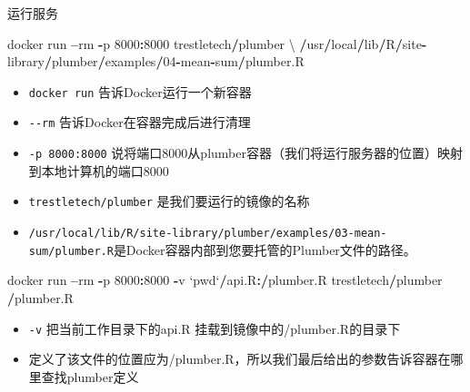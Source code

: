 \documentclass[]{book}
\newenvironment{Shaded}{\begin{snugshade}}{\end{snugshade}}
\newcommand{\DataTypeTok}[1]{\textcolor[rgb]{0.13,0.29,0.53}{#1}}
\newcommand{\DecValTok}[1]{\textcolor[rgb]{0.00,0.00,0.81}{#1}}
\newcommand{\StringTok}[1]{\textcolor[rgb]{0.31,0.60,0.02}{#1}}
\newcommand{\OperatorTok}[1]{\textcolor[rgb]{0.81,0.36,0.00}{\textbf{#1}}}
\newcommand{\ErrorTok}[1]{\textcolor[rgb]{0.64,0.00,0.00}{\textbf{#1}}}
\newcommand{\NormalTok}[1]{#1}
\providecommand{\tightlist}{%
  \setlength{\itemsep}{0pt}\setlength{\parskip}{0pt}}
\begin{document}
运行服务

\begin{Shaded}
\begin{Highlighting}[]
\NormalTok{docker run }\OperatorTok{--}\NormalTok{rm }\OperatorTok{-}\NormalTok{p }\DecValTok{8000}\OperatorTok{:}\DecValTok{8000}\NormalTok{ trestletech}\OperatorTok{/}\NormalTok{plumber \textbackslash{}}
  \OperatorTok{/}\NormalTok{usr}\OperatorTok{/}\NormalTok{local}\OperatorTok{/}\NormalTok{lib}\OperatorTok{/}\NormalTok{R}\OperatorTok{/}\NormalTok{site}\OperatorTok{-}\NormalTok{library}\OperatorTok{/}\NormalTok{plumber}\OperatorTok{/}\NormalTok{examples}\OperatorTok{/}\DecValTok{04}\OperatorTok{-}\NormalTok{mean}\OperatorTok{-}\NormalTok{sum}\OperatorTok{/}\NormalTok{plumber.R}
\end{Highlighting}
\end{Shaded}

\begin{itemize}
\item
  \texttt{docker\ run} 告诉Docker运行一个新容器
\item
  \texttt{-\/-rm} 告诉Docker在容器完成后进行清理
\item
  \texttt{-p\ 8000:8000}
  说将端口8000从plumber容器（我们将运行服务器的位置）映射到本地计算机的端口8000
\item
  \texttt{trestletech/plumber} 是我们要运行的镜像的名称
\item
  \texttt{/usr/local/lib/R/site-library/plumber/examples/03-mean-sum/plumber.R}是Docker容器内部到您要托管的Plumber文件的路径。
\end{itemize}

\begin{Shaded}
\begin{Highlighting}[]
\NormalTok{docker run }\OperatorTok{--}\NormalTok{rm }\OperatorTok{-}\NormalTok{p }\DecValTok{8000}\OperatorTok{:}\DecValTok{8000} \OperatorTok{-}\NormalTok{v }\StringTok{`}\DataTypeTok{pwd}\StringTok{`}\OperatorTok{/}\NormalTok{api.R}\OperatorTok{:}\ErrorTok{/}\NormalTok{plumber.R trestletech}\OperatorTok{/}\NormalTok{plumber }\OperatorTok{/}\NormalTok{plumber.R}
\end{Highlighting}
\end{Shaded}

\begin{itemize}
\tightlist
\item
  \texttt{-v} 把当前工作目录下的api.R 挂载到镜像中的/plumber.R的目录下
\item
  定义了该文件的位置应为/plumber.R，所以我们最后给出的参数告诉容器在哪里查找plumber定义
\end{itemize}
\end{document}
